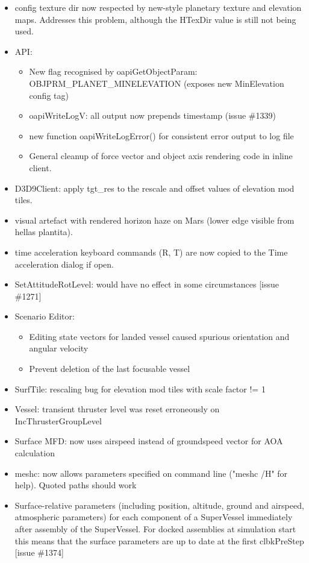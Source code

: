 \documentclass[Orbiter User Manual.tex]{subfiles}
\begin{document}
\begin{itemize}
\begin{itemize}
	\end{itemize}
	\item config texture dir now respected by new-style planetary texture and elevation maps. Addresses this problem, although the HTexDir value is still not being used.
	\item API:
	\begin{itemize}
		\item New flag recognised by oapiGetObjectParam: OBJPRM\_PLANET\_MINELEVATION (exposes new MinElevation config tag)
		\item oapiWriteLogV: all output now prepends timestamp (issue \#1339)
		\item new function oapiWriteLogError() for consistent error output to log file
		\item General cleanup of force vector and object axis rendering code in inline client.
	\end{itemize}
	\item D3D9Client: apply tgt\_res to the rescale and offset values of elevation mod tiles.
	\item visual artefact with rendered horizon haze on Mars (lower edge visible from hellas plantita).
	\item time acceleration keyboard commands (R, T) are now copied to the Time acceleration dialog if open.
	\item SetAttitudeRotLevel: would have no effect in some circumstances [issue \#1271]
	\item Scenario Editor:
	\begin{itemize}
		\item Editing state vectors for landed vessel caused spurious orientation and angular velocity
		\item Prevent deletion of the last focusable vessel
	\end{itemize}
	\item SurfTile: rescaling bug for elevation mod tiles with scale factor != 1
	\item Vessel: transient thruster level was reset erroneously on IncThrusterGroupLevel
	\item Surface MFD: now uses airspeed instead of groundspeed vector for AOA calculation
	\item meshc: now allows parameters specified on command line ("meshc /H" for help). Quoted paths should work
	\item Surface-relative parameters (including position, altitude, ground and airspeed, atmospheric parameters) for each component of a SuperVessel immediately after assembly of the SuperVessel. For docked assemblies at simulation start this means that the surface parameters are up to date at the first clbkPreStep [issue \#1374]

\end{itemize}
\end{document}
